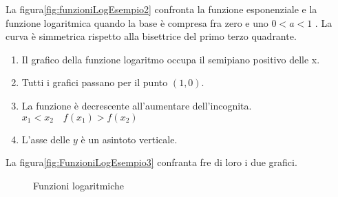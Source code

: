 La figura\nobs\vref{fig:funzioniLogEsempio2} confronta la funzione esponenziale e la funzione logaritmica  quando la base è compresa fra zero e uno $0<a<1$ . La curva è simmetrica rispetto alla bisettrice del primo terzo quadrante. 
\begin{enumerate}
	\item Il grafico della funzione logaritmo occupa il semipiano positivo delle x.
	\item Tutti i grafici passano per il punto $(1,0)$.
	\item La funzione è decrescente all'aumentare dell'incognita. $x_1<x_2\quad f(x_1)>f(x_2)$ 
	\item L'asse delle $y$ è un asintoto verticale.
\end{enumerate}
La figura\nobs\vref{fig:FunzioniLogEsempio3} confranta fre di loro i due grafici.
\begin{figure}
	\centering
	
	\caption{Funzioni logaritmiche}
	\label{fig:FunzioniLogEsempio3}
\end{figure}
